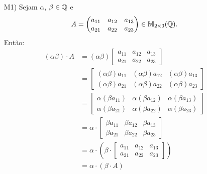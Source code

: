 \begin{exemplo}
\begin{enumerate}[label={\arabic*})]
\begin{solucao}
\begin{itemize}
              \item[M1)] Sejam $\alpha$, $\beta \in \mathbb{Q}$ e
                \[
                  A = \begin{pmatrix} a_{11} & a_{12} & a_{13}\\a_{21} & a_{22} & a_{23}\end{pmatrix} \in \mathbb{M}_{2 \times 3}(\mathbb{Q}).
                \]
                Então:
                \begin{align*}
                  (\alpha\beta)\cdot A & = (\alpha\beta)\begin{bmatrix} a_{11} & a_{12} & a_{13}\\a_{21} & a_{22} & a_{23}\end{bmatrix}
                  \\ &= \begin{bmatrix} (\alpha\beta)a_{11} & (\alpha\beta)a_{12} & (\alpha\beta)a_{13}\\(\alpha\beta)a_{21} & (\alpha\beta)a_{22} & (\alpha\beta)a_{23}\end{bmatrix}
                  \\ &= \begin{bmatrix} \alpha(\beta a_{11}) & \alpha(\beta a_{12}) & \alpha(\beta a_{13})\\\alpha(\beta a_{21}) & \alpha(\beta a_{22}) & \alpha(\beta a_{23})\end{bmatrix}
                  \\ &= \alpha\cdot\begin{bmatrix} \beta a_{11} & \beta a_{12} & \beta a_{13}\\\beta a_{21} & \beta a_{22} & \beta a_{23}\end{bmatrix}
                  \\ &= \alpha\cdot\left(\beta\cdot\begin{bmatrix} a_{11} & a_{12} & a_{13}\\a_{21} & a_{22} & a_{23}\end{bmatrix}\right)
                  \\ &= \alpha\cdot(\beta\cdot A)
                \end{align*}


\end{itemize}
\end{solucao}
\end{enumerate}
\end{exemplo}
